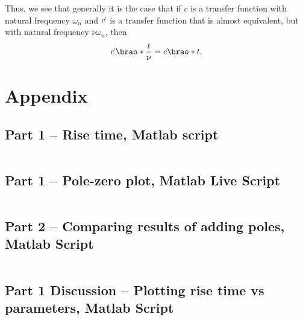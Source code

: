 \documentclass[12pt]{article}
\DeclarePairedDelimiter\brao()%
\newcommand{\setprime}[2][1]{%
    {#2}^{%
        \raisebox{1pt}{%
            \scalebox{0.5}{%
                \itshape\sffamily\uppercase%
                \expandafter{%
                    \romannumeral#1%
                }%
            }%
        }
    }%
}%
\begin{document}
Thus, we see that generally it is the case that if $c$ is a transfer function with natural frequency $\omega_n$
and $\setprime{c}$ is a transfer function that is almost equivalent, but with natural frequency $\nu\omega_n$,
then
\begin{equation}
    \setprime{c}\brao*{\frac{t}\nu} = c\brao*t.
\end{equation}

\newpage
\printbibliography

\newpage
\appendix
\section{Appendix}

\subsection{Part 1 -- Rise time, Matlab script}\label{sap:solving for .9cf and .1cf}
\inputminted{matlab}{src/part01a_rise_time.m}

\subsection{Part 1 -- Pole-zero plot, Matlab Live Script}\label{sap:pzplot}
\inputminted{matlab}{src/part01a_pzplot_mlx.m}

\subsection{Part 2 -- Comparing results of adding poles, Matlab Script}\label{sap:adding poles}
\inputminted{matlab}{src/part02_adding_poles.m}

\subsection{Part 1 Discussion -- Plotting rise time vs parameters, Matlab Script}\label{sap:rise time vs parameters}
\inputminted{matlab}{src/part01_rise_time_vs_parameters_plot.m}
\end{document}
